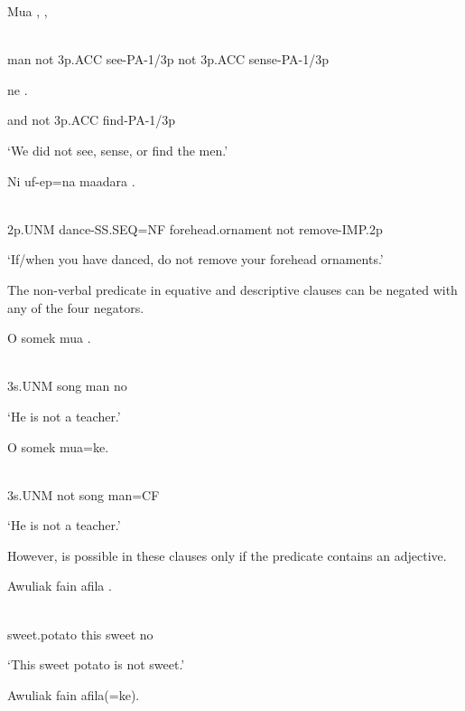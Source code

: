 \ea%
\label{ex:x1092}
\gll Mua  ,  , \\
      \\
\glt
\z

man  not  3p.ACC  see-PA-1/3p  not  3p.ACC  sense-PA-1/3p

ne  .

and  not  3p.ACC  find-PA-1/3p

`We did not see, sense, or find the men.'

\ea%
\label{ex:x1113}
\gll Ni \textstyleEmphasizedVernacularWords{} uf-ep=na  maadara  . \\
      \\
\glt
\z

2p.UNM  dance-SS.SEQ=NF  forehead.ornament  not  remove-IMP.2p

`If/when you have danced, do not remove your forehead ornaments.'

The non-verbal predicate in equative and descriptive clauses can be negated with any of the four negators. 

\ea%
\label{ex:x1093}
\gll O  somek  mua  . \\
      \\
\glt
\z

3s.UNM  song  man  no

`He is not a teacher.'

\ea%
\label{ex:x1095}
\gll O    somek  mua=ke. \\
      \\
\glt
\z

3s.UNM  not  song  man=CF

`He is not a teacher.' 

However,  is possible in these clauses only if the predicate contains an adjective.

\ea%
\label{ex:x1096}
\gll Awuliak  fain  afila  . \\
      \\
\glt
\z

sweet.potato  this  sweet  no

`This sweet potato is not sweet.'

\ea%
\label{ex:x1097}
\gll Awuliak  fain    afila(=ke). \\
      \\
\glt
\z

